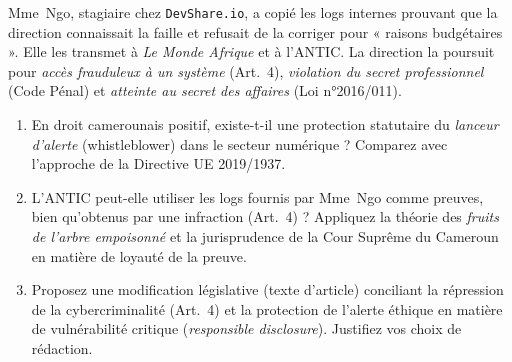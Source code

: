\documentclass[11pt]{article}
\begin{document}
\begin{exercice}
Mme~Ngo, stagiaire chez \texttt{DevShare.io}, a copié les logs internes prouvant que la direction connaissait la faille et refusait de la corriger pour « raisons budgétaires ». Elle les transmet à \textit{Le Monde Afrique} et à l'ANTIC. La direction la poursuit pour \textit{accès frauduleux à un système} (Art.~4), \textit{violation du secret professionnel} (Code Pénal) et \textit{atteinte au secret des affaires} (Loi n°2016/011).
\begin{enumerate}
    \item En droit camerounais positif, existe-t-il une protection statutaire du \textit{lanceur d'alerte} (whistleblower) dans le secteur numérique ? Comparez avec l'approche de la Directive UE 2019/1937.
    \item L'ANTIC peut-elle utiliser les logs fournis par Mme~Ngo comme preuves, bien qu'obtenus par une infraction (Art.~4) ? Appliquez la théorie des \textit{fruits de l'arbre empoisonné} et la jurisprudence de la Cour Suprême du Cameroun en matière de loyauté de la preuve.
    \item Proposez une modification législative (texte d'article) conciliant la répression de la cybercriminalité (Art.~4) et la protection de l'alerte éthique en matière de vulnérabilité critique (\textit{responsible disclosure}). Justifiez vos choix de rédaction.
\end{enumerate}
\end{exercice}
\end{document}
